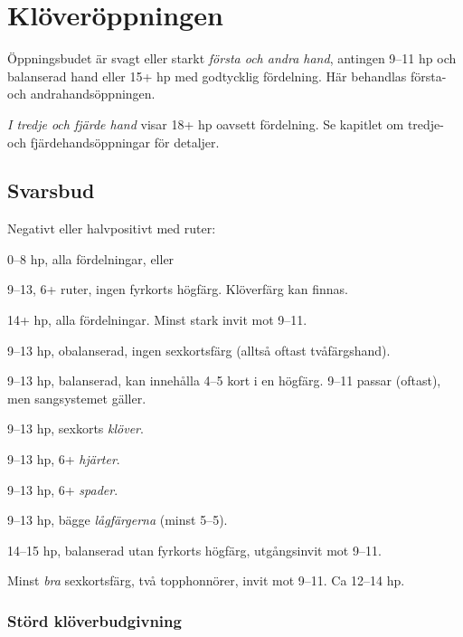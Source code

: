 \chapter{Kl\"over\"oppningen}

\"Oppningsbudet  \"ar svagt eller starkt {\em f\"orsta och andra
  hand}, antingen 9--11 hp och balanserad hand eller 15+ hp med godtycklig
f\"ordelning. Här behandlas första- och andrahandsöppningen. 

{\em I tredje och fj{\"a}rde hand} visar  18+ hp oavsett fördelning.
Se kapitlet om tredje- och fj\"ardehands\"oppningar f\"or detaljer.


\section{Svarsbud}\nytt

\bbe
   \item[--\ru{1}] Negativt eller halvpositivt med ruter:
     \bnu
   \item 0--8 hp, alla fördelningar, eller
   \item 9--13, 6+ ruter, ingen fyrkorts högfärg. Klöverfärg kan finnas.
     \enu
   \item[--\hj{1}] 14+ hp, alla fördelningar. Minst stark invit mot 9--11. 
   \item[--\spa{1}] 9--13 hp, obalanserad, ingen sexkortsfärg (alltså
     oftast tvåfärgshand).
   \item[--\NT{1}] 9--13 hp, balanserad, kan innehålla 4--5 kort i en
     högfärg. 9--11 passar (oftast), men sangsystemet gäller.
   \item[--\kl{2}] 9--13 hp, sexkorts \emph{klöver}.
   \item[--\ru{2}] 9--13 hp, 6+ \emph{hjärter}.
   \item[--\hj{2}] 9--13 hp, 6+ \emph{spader}.
   \item[--\spa{2}] 9--13 hp, bägge \emph{lågfärgerna} (minst 5--5).
   \item[--\NT{2}] 14--15 hp, balanserad utan fyrkorts högfärg,
     utgångsinvit mot 9--11.
   \item[--\la{3}] Minst {\em bra} sexkortsf\"arg, två
     topphonnörer, invit mot 9--11. Ca 12--14 hp.

\ebe

\subsection{St{\"o}rd kl{\"o}verbudgivning}

